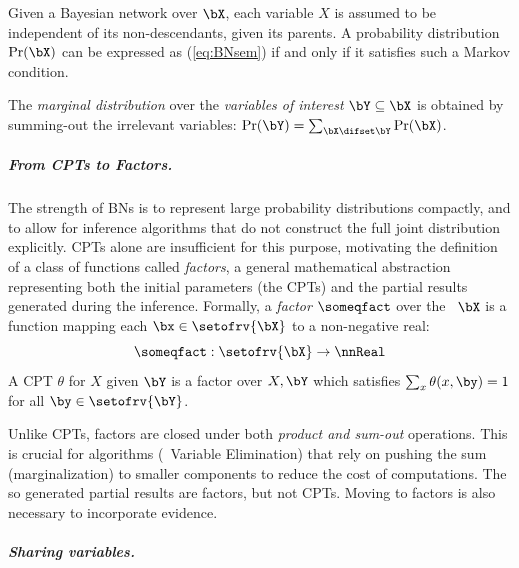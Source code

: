 \begin{remark}
Given a Bayesian network over $\bX$, each variable $X$ is assumed to be independent of its non-descendants, given its parents.
A probability distribution $\Pr(\bX)$ can be expressed as (\ref{eq:BNsem}) if and only if it satisfies such a Markov condition.
\end{remark}

The \emph{marginal distribution} over the \emph{variables of interest} $\bY \subseteq \bX$ is obtained by summing-out the irrelevant variables:
$\Pr(\bY)= \sum_{\bX\difset\bY} \Pr(\bX)$.
 
\subparagraph{From CPTs to Factors.}

The strength of BNs is to represent large probability distributions compactly, and to allow for inference algorithms that do not construct the full joint distribution explicitly.
CPTs alone are insufficient for this purpose, motivating the definition of a class of functions called \emph{factors}, a general mathematical abstraction representing both the initial parameters (the CPTs) and the partial results generated during the inference.
Formally, a \emph{factor} $\someqfact$ over the \rvs\ $\bX$ is a function mapping each $\bx\in\setofrv{\bX}$ to a non-negative real:
\begin{equation}
\label{eq:factor}
\someqfact:\setofrv{\bX}\to\nnReal
\end{equation}
A CPT $\theta$ for $X$ given $\bY$ is a factor over $X,\bY$ which satisfies $\sum_x \theta({x,\by}) = 1$ for all $\by\in\setofrv{\bY}$.

Unlike CPTs, factors are closed under both \emph{product and sum-out} operations.
This is crucial for algorithms (\eg\ Variable Elimination) that rely on pushing the sum (marginalization) to smaller components to reduce the cost of computations.
The so generated partial results are factors, but not CPTs.
Moving to factors is also necessary to incorporate evidence.

\subparagraph{Sharing variables.}

